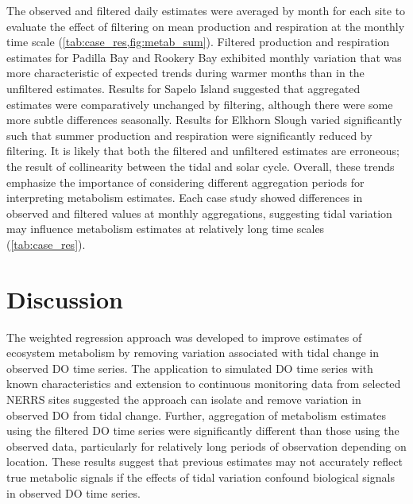 \documentclass[letterpaper,12pt,oneside]{article}\usepackage[]{graphicx}\usepackage[]{color}
\begin{document}
The observed and filtered daily estimates were averaged by month for each site to evaluate the effect of filtering on mean production and respiration at the monthly time scale (\cref{tab:case_res,fig:metab_sum}).  Filtered production and respiration estimates for Padilla Bay and Rookery Bay exhibited monthly variation that was more characteristic of expected trends during warmer months than in the unfiltered estimates.  Results for Sapelo Island suggested that aggregated estimates were comparatively unchanged by filtering, although there were some more subtle differences seasonally.  Results for Elkhorn Slough varied significantly such that summer production and respiration were significantly reduced by filtering. It is likely that both the filtered and unfiltered estimates are erroneous; the result of collinearity between the tidal and solar cycle.  Overall, these trends emphasize the importance of considering different aggregation periods for interpreting metabolism estimates.  Each case study showed differences in observed and filtered values at monthly aggregations, suggesting tidal variation may influence metabolism estimates at relatively long time scales (\cref{tab:case_res}).      

 

\section{Discussion}

The weighted regression approach was developed to improve estimates of ecosystem metabolism by removing variation associated with tidal change in observed \ac{DO} time series.  The application to simulated \ac{DO} time series with known characteristics and extension to continuous monitoring data from selected \ac{NERRS} sites suggested the approach can isolate and remove variation in observed \ac{DO} from tidal change.  Further, aggregation of metabolism estimates using the filtered \ac{DO} time series were significantly different than those using the observed data, particularly for relatively long periods of observation depending on location. These results suggest that previous estimates may not accurately reflect true metabolic signals if the effects of tidal variation confound biological signals in observed \ac{DO} time series.
\end{document}
